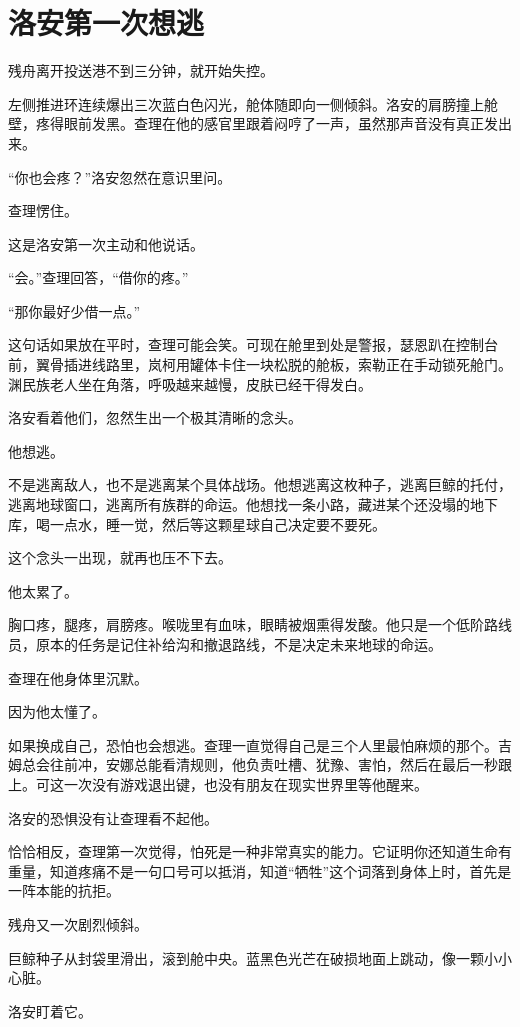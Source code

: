 \chapter{洛安第一次想逃}

残舟离开投送港不到三分钟，就开始失控。

左侧推进环连续爆出三次蓝白色闪光，舱体随即向一侧倾斜。洛安的肩膀撞上舱壁，疼得眼前发黑。查理在他的感官里跟着闷哼了一声，虽然那声音没有真正发出来。

“你也会疼？”洛安忽然在意识里问。

查理愣住。

这是洛安第一次主动和他说话。

“会。”查理回答，“借你的疼。”

“那你最好少借一点。”

这句话如果放在平时，查理可能会笑。可现在舱里到处是警报，瑟恩趴在控制台前，翼骨插进线路里，岚柯用罐体卡住一块松脱的舱板，索勒正在手动锁死舱门。渊民族老人坐在角落，呼吸越来越慢，皮肤已经干得发白。

洛安看着他们，忽然生出一个极其清晰的念头。

他想逃。

不是逃离敌人，也不是逃离某个具体战场。他想逃离这枚种子，逃离巨鲸的托付，逃离地球窗口，逃离所有族群的命运。他想找一条小路，藏进某个还没塌的地下库，喝一点水，睡一觉，然后等这颗星球自己决定要不要死。

这个念头一出现，就再也压不下去。

他太累了。

胸口疼，腿疼，肩膀疼。喉咙里有血味，眼睛被烟熏得发酸。他只是一个低阶路线员，原本的任务是记住补给沟和撤退路线，不是决定未来地球的命运。

查理在他身体里沉默。

因为他太懂了。

如果换成自己，恐怕也会想逃。查理一直觉得自己是三个人里最怕麻烦的那个。吉姆总会往前冲，安娜总能看清规则，他负责吐槽、犹豫、害怕，然后在最后一秒跟上。可这一次没有游戏退出键，也没有朋友在现实世界里等他醒来。

洛安的恐惧没有让查理看不起他。

恰恰相反，查理第一次觉得，怕死是一种非常真实的能力。它证明你还知道生命有重量，知道疼痛不是一句口号可以抵消，知道“牺牲”这个词落到身体上时，首先是一阵本能的抗拒。

残舟又一次剧烈倾斜。

巨鲸种子从封袋里滑出，滚到舱中央。蓝黑色光芒在破损地面上跳动，像一颗小小心脏。

洛安盯着它。

